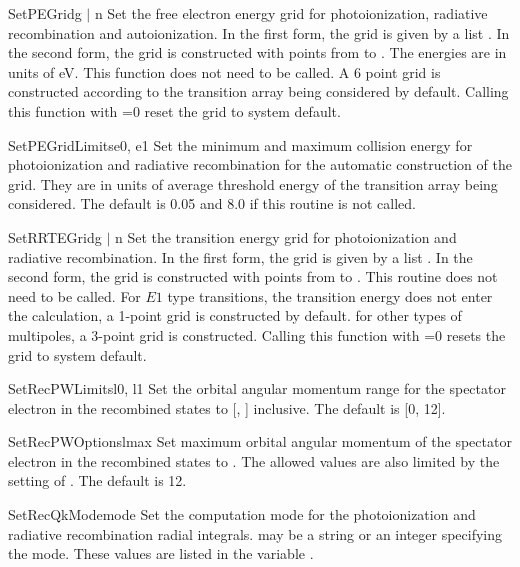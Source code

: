 \begin{fundesc}{SetPEGrid}{g $\mid$ n}
Set the free electron energy grid for photoionization, radiative recombination
and autoionization. In the first form, the grid is given by a list
. In the second form, the grid is constructed with  points from
 to . The energies are in units of eV. This function does not
need to be called. A 6 point grid is constructed according to the transition
array being considered by default. Calling this function with =0 reset
the grid to system default. 
\end{fundesc}

\begin{fundesc}{SetPEGridLimits}{e0, e1}
Set the minimum and maximum collision energy for photoionization and radiative
recombination for the automatic construction of the grid. They are in units of
average threshold energy of the transition array being considered. The default
is 0.05 and 8.0 if this routine is not called.
\end{fundesc}

\begin{fundesc}{SetRRTEGrid}{g $\mid$ n}
Set the transition energy grid for photoionization and radiative recombination.
In the first form, the grid is given by a list . In the second form, the
grid is constructed with  points from  to . This routine
does not need to be called. For $E1$ type transitions, the transition energy
does not enter the calculation, a 1-point grid is constructed by default. for
other types of multipoles, a 3-point grid is constructed. Calling this function
with =0 resets the grid to system default.
\end{fundesc}

\begin{fundesc}{SetRecPWLimits}{l0, l1}
Set the orbital angular momentum range for the spectator electron in the
recombined states to [, ] inclusive. The default is [0, 12].
\end{fundesc}

\begin{fundesc}{SetRecPWOptions}{lmax}
Set maximum orbital angular momentum of the spectator electron in the
recombined states to . The allowed values are also limited by the
setting of . The default is 12.
\end{fundesc}

\begin{fundesc}{SetRecQkMode}{mode}
Set the computation mode for the photoionization and radiative recombination
radial integrals.  may be a string or an integer specifying the
mode. These values are listed in the variable .
\end{fundesc}

